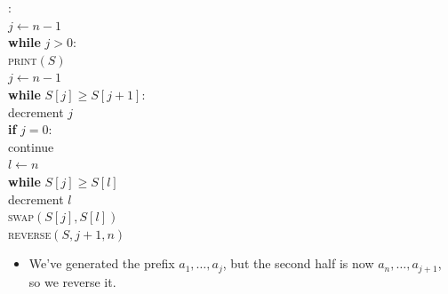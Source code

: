 \documentclass[aspectratio=169]{beamer}
\begin{document}
\begin{frame}{}
\begin{minipage}[c]{0.6\textwidth}
\begin{nalgo}
: 
\\\label{}{\color{lightgray}  $j \gets n-1$}
\\\label{}{\color{lightgray}  \textbf{while} $j > 0$:\+}
\\\label{}{\color{lightgray}      \textsc{print}$(S)$}
\\\label{}{\color{lightgray}      $j \gets n-1$}
\\\label{}{\color{lightgray}      \textbf{while} $S[j] \geq S[j+1]$:\+}
\\\label{}{\color{lightgray}          decrement $j$\-}
\\\label{}{\color{lightgray}      \textbf{if} $j = 0$: \+}
\\\label{}{\color{lightgray}          continue \-}
\\\label{}{\color{lightgray}      $l \gets n$}
\\\label{}{\color{lightgray}      \textbf{while} $S[j] \geq S[l]$ \+}
\\\label{}{\color{lightgray}          decrement $l$\-}
\\\label{}{\color{lightgray}      \textsc{swap}$(S[j], S[l])$}
\\\label{}     \textsc{reverse}$(S, j+1, n)$
\end{nalgo}
\end{minipage}
\begin{minipage}[c]{0.35\textwidth}
\begin{itemize}
    \item We've generated the prefix $a_1, \dots, a_j$, but the second half is now $a_n, \dots, a_{j+1}$, so we reverse it.
\end{itemize}
\end{minipage}
\end{frame}

% 
\end{document}
